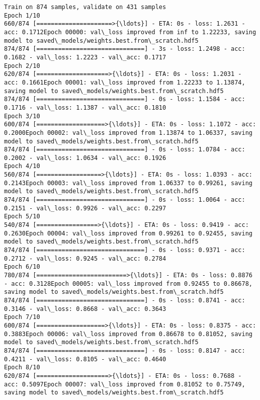 \documentclass[11pt]{article}
\begin{document}
    \begin{Verbatim}[commandchars=\\\{\}]
Train on 874 samples, validate on 431 samples
Epoch 1/10
660/874 [=====================>{\ldots}] - ETA: 0s - loss: 1.2631 - acc: 0.1712Epoch 00000: val\_loss improved from inf to 1.22233, saving model to saved\_models/weights.best.from\_scratch.hdf5
874/874 [==============================] - 3s - loss: 1.2498 - acc: 0.1682 - val\_loss: 1.2223 - val\_acc: 0.1717
Epoch 2/10
620/874 [====================>{\ldots}] - ETA: 0s - loss: 1.2031 - acc: 0.1661Epoch 00001: val\_loss improved from 1.22233 to 1.13874, saving model to saved\_models/weights.best.from\_scratch.hdf5
874/874 [==============================] - 0s - loss: 1.1584 - acc: 0.1716 - val\_loss: 1.1387 - val\_acc: 0.1810
Epoch 3/10
600/874 [===================>{\ldots}] - ETA: 0s - loss: 1.1072 - acc: 0.2000Epoch 00002: val\_loss improved from 1.13874 to 1.06337, saving model to saved\_models/weights.best.from\_scratch.hdf5
874/874 [==============================] - 0s - loss: 1.0784 - acc: 0.2002 - val\_loss: 1.0634 - val\_acc: 0.1926
Epoch 4/10
560/874 [==================>{\ldots}] - ETA: 0s - loss: 1.0393 - acc: 0.2143Epoch 00003: val\_loss improved from 1.06337 to 0.99261, saving model to saved\_models/weights.best.from\_scratch.hdf5
874/874 [==============================] - 0s - loss: 1.0064 - acc: 0.2151 - val\_loss: 0.9926 - val\_acc: 0.2297
Epoch 5/10
540/874 [=================>{\ldots}] - ETA: 0s - loss: 0.9419 - acc: 0.2630Epoch 00004: val\_loss improved from 0.99261 to 0.92455, saving model to saved\_models/weights.best.from\_scratch.hdf5
874/874 [==============================] - 0s - loss: 0.9371 - acc: 0.2712 - val\_loss: 0.9245 - val\_acc: 0.2784
Epoch 6/10
780/874 [=========================>{\ldots}] - ETA: 0s - loss: 0.8876 - acc: 0.3128Epoch 00005: val\_loss improved from 0.92455 to 0.86678, saving model to saved\_models/weights.best.from\_scratch.hdf5
874/874 [==============================] - 0s - loss: 0.8741 - acc: 0.3146 - val\_loss: 0.8668 - val\_acc: 0.3643
Epoch 7/10
600/874 [===================>{\ldots}] - ETA: 0s - loss: 0.8375 - acc: 0.3883Epoch 00006: val\_loss improved from 0.86678 to 0.81052, saving model to saved\_models/weights.best.from\_scratch.hdf5
874/874 [==============================] - 0s - loss: 0.8147 - acc: 0.4211 - val\_loss: 0.8105 - val\_acc: 0.4640
Epoch 8/10
620/874 [====================>{\ldots}] - ETA: 0s - loss: 0.7688 - acc: 0.5097Epoch 00007: val\_loss improved from 0.81052 to 0.75749, saving model to saved\_models/weights.best.from\_scratch.hdf5

\end{Verbatim}
\end{document}
